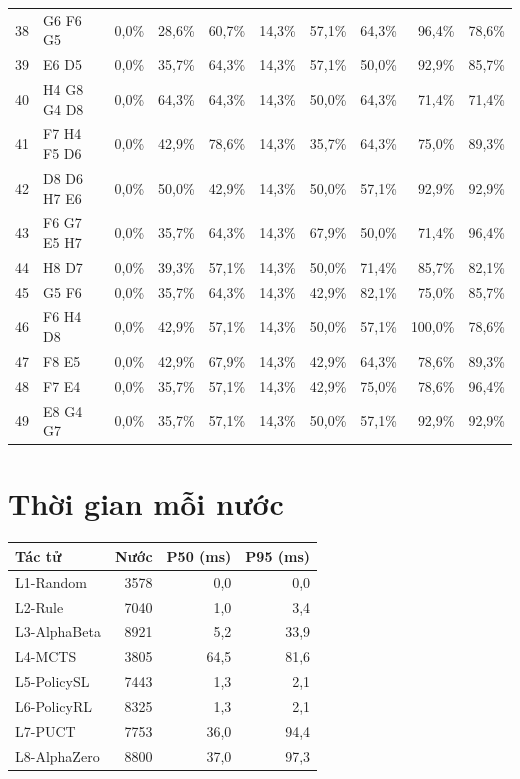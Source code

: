 \begin{small}
\begin{longtable}{@{}rlrrrrrrrr@{}}
38 & G6 F6 G5 & 0,0\% & 28,6\% & 60,7\% & 14,3\% & 57,1\% & 64,3\% & 96,4\% & 78,6\% \\
39 & E6 D5 & 0,0\% & 35,7\% & 64,3\% & 14,3\% & 57,1\% & 50,0\% & 92,9\% & 85,7\% \\
40 & H4 G8 G4 D8 & 0,0\% & 64,3\% & 64,3\% & 14,3\% & 50,0\% & 64,3\% & 71,4\% & 71,4\% \\
41 & F7 H4 F5 D6 & 0,0\% & 42,9\% & 78,6\% & 14,3\% & 35,7\% & 64,3\% & 75,0\% & 89,3\% \\
42 & D8 D6 H7 E6 & 0,0\% & 50,0\% & 42,9\% & 14,3\% & 50,0\% & 57,1\% & 92,9\% & 92,9\% \\
43 & F6 G7 E5 H7 & 0,0\% & 35,7\% & 64,3\% & 14,3\% & 67,9\% & 50,0\% & 71,4\% & 96,4\% \\
44 & H8 D7 & 0,0\% & 39,3\% & 57,1\% & 14,3\% & 50,0\% & 71,4\% & 85,7\% & 82,1\% \\
45 & G5 F6 & 0,0\% & 35,7\% & 64,3\% & 14,3\% & 42,9\% & 82,1\% & 75,0\% & 85,7\% \\
46 & F6 H4 D8 & 0,0\% & 42,9\% & 57,1\% & 14,3\% & 50,0\% & 57,1\% & 100,0\% & 78,6\% \\
47 & F8 E5 & 0,0\% & 42,9\% & 67,9\% & 14,3\% & 42,9\% & 64,3\% & 78,6\% & 89,3\% \\
48 & F7 E4 & 0,0\% & 35,7\% & 57,1\% & 14,3\% & 42,9\% & 75,0\% & 78,6\% & 96,4\% \\
49 & E8 G4 G7 & 0,0\% & 35,7\% & 57,1\% & 14,3\% & 50,0\% & 57,1\% & 92,9\% & 92,9\% \\
\bottomrule
\end{longtable}
\end{small}
\section{Thời gian mỗi nước}
\begin{small}
\begin{tabular}{@{}lrrr@{}}
\toprule
Tác tử & Nước & P50 (ms) & P95 (ms) \\
\midrule
L1-Random & 3578 & 0,0 & 0,0 \\
L2-Rule & 7040 & 1,0 & 3,4 \\
L3-AlphaBeta & 8921 & 5,2 & 33,9 \\
L4-MCTS & 3805 & 64,5 & 81,6 \\
L5-PolicySL & 7443 & 1,3 & 2,1 \\
L6-PolicyRL & 8325 & 1,3 & 2,1 \\
L7-PUCT & 7753 & 36,0 & 94,4 \\
L8-AlphaZero & 8800 & 37,0 & 97,3 \\
\bottomrule
\end{tabular}
\end{small}

